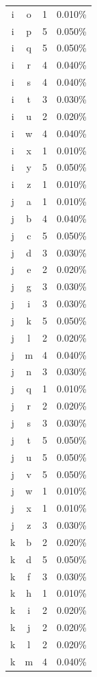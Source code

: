 \begin{longtable}{cccc}
    i & o & 1 & 0.010\% \\
    i & p & 5 & 0.050\% \\
    i & q & 5 & 0.050\% \\
    i & r & 4 & 0.040\% \\
    i & s & 4 & 0.040\% \\
    i & t & 3 & 0.030\% \\
    i & u & 2 & 0.020\% \\
    i & w & 4 & 0.040\% \\
    i & x & 1 & 0.010\% \\
    i & y & 5 & 0.050\% \\
    i & z & 1 & 0.010\% \\
    j & a & 1 & 0.010\% \\
    j & b & 4 & 0.040\% \\
    j & c & 5 & 0.050\% \\
    j & d & 3 & 0.030\% \\
    j & e & 2 & 0.020\% \\
    j & g & 3 & 0.030\% \\
    j & i & 3 & 0.030\% \\
    j & k & 5 & 0.050\% \\
    j & l & 2 & 0.020\% \\
    j & m & 4 & 0.040\% \\
    j & n & 3 & 0.030\% \\
    j & q & 1 & 0.010\% \\
    j & r & 2 & 0.020\% \\
    j & s & 3 & 0.030\% \\
    j & t & 5 & 0.050\% \\
    j & u & 5 & 0.050\% \\
    j & v & 5 & 0.050\% \\
    j & w & 1 & 0.010\% \\
    j & x & 1 & 0.010\% \\
    j & z & 3 & 0.030\% \\
    k & b & 2 & 0.020\% \\
    k & d & 5 & 0.050\% \\
    k & f & 3 & 0.030\% \\
    k & h & 1 & 0.010\% \\
    k & i & 2 & 0.020\% \\
    k & j & 2 & 0.020\% \\
    k & l & 2 & 0.020\% \\
    k & m & 4 & 0.040\% \\

\end{longtable}
